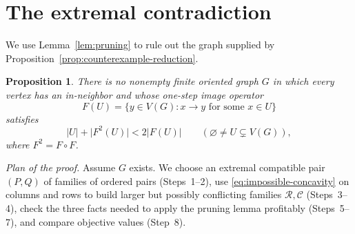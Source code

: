 \documentclass[11pt]{article}
\newtheorem{proposition}[theorem]{Proposition}
\theoremstyle{remark}
\newcommand{\abs}[1]{\lvert #1\rvert}
\newcommand{\cR}{\mathcal R}
\newcommand{\cC}{\mathcal C}
\begin{document}
\section{The extremal contradiction}\label{sec:incompatibility}

We use Lemma~\ref{lem:pruning} to rule out the graph supplied by
Proposition~\ref{prop:counterexample-reduction}.

\begin{proposition}\label{prop:no-concavity}
There is no nonempty finite oriented graph $G$ in which every vertex has an
in-neighbor and whose one-step image operator
\[
 F(U)=\{y\in V(G):x\to y\text{ for some }x\in U\}
\]
satisfies
\begin{equation}\label{eq:impossible-concavity}
 \abs{U}+\abs{F^2(U)}<2\abs{F(U)}
 \qquad(\varnothing\ne U\subsetneq V(G)),
\end{equation}
where $F^2=F\circ F$.
\end{proposition}

\emph{Plan of the proof.} Assume $G$ exists. We choose an extremal compatible
pair $(P,Q)$ of families of ordered pairs (Steps~1--2), use
\eqref{eq:impossible-concavity} on columns and rows to build larger but
possibly conflicting families $\cR,\cC$ (Steps~3--4), check the three facts
needed to apply the pruning lemma profitably (Steps~5--7), and compare
objective values (Step~8).
\end{document}
